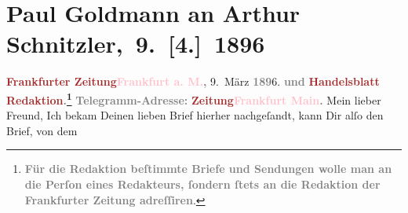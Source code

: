 

               \section[Paul Goldmann an Arthur Schnitzler, Paul Goldmann an Arthur Schnitzler, 9. {[}4.{]} 1896]{ Paul Goldmann an Arthur Schnitzler, 9. {[}4.{]} 1896}\nopagebreak{}\rehead{ }\normalsize\beginnumbering{} \toendnotes[C]{\smallbreak\pagebreak[2]} 
\toendnotes[C]{\smallbreak}\pstart
           \noindent{}{\pb}\textcolor{gray}{\textbf{\textbf{\textcolor{brown}{Frankfurter Zeitung}{}\ledrightnote{\textcolor{brown}{Frankfurter Zeitung}}}}}\hfill \textcolor{gray}{\textbf{\textcolor{pink}{Frankfurt a. M.}{}\ledrightnote{\textcolor{pink}{Frankfurt am Main}}, }}9. März \textcolor{gray}{\textbf{189}}6.\pend
           \pstart
           \textcolor{gray}{\textbf{und}}\pend
           \pstart
           \textcolor{gray}{\textbf{\textcolor{brown}{Handelsblatt}{}}}\pend
           \pstart
           \textcolor{gray}{\textbf{\textbf{\textcolor{brown}{Redaktion}{}.\footnote{\noindent{}\textcolor{gray}{\textbf{Für die Redaktion beſtimmte Briefe und Sendungen
                                 wolle man  an die Perſon eines
                                 Redakteurs, ſondern ſtets \textbf{an die Redaktion der
                                    Frankfurter Zeitung} adreſſiren}}.}}}}\pend
           \pstart
           \textcolor{gray}{\textbf{Telegramm-Adresse:}}\pend
           \pstart
           \textcolor{gray}{\textbf{\textbf{\textcolor{brown}{Zeitung}{}\textcolor{pink}{Frankfurt Main}{}\ledrightnote{\textcolor{pink}{Frankfurt am Main}}.}}}\pend
           \pstart\center{}Mein lieber Freund,\pend\pstart
           Ich bekam Deinen lieben Brief hierher nachgeſandt, kann Dir alſo den Brief, von dem
